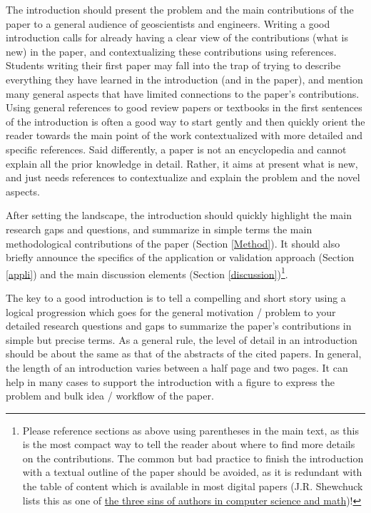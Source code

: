 \documentclass[preprint]{ring}
\begin{document}
The introduction should present the problem and the main contributions of the paper to a general audience of geoscientists and engineers. Writing a good introduction calls for already having a clear view of the contributions (what is new) in the paper, and contextualizing these contributions using references. Students writing their first paper may fall into the trap of trying to describe everything they have learned in the introduction (and in the paper), and mention many general aspects that have limited connections to the paper's contributions. Using general references to good review papers or textbooks in the first sentences of the introduction is often a good way to start gently and then quickly orient the reader towards the main point of the work contextualized with more detailed and specific references. Said differently, a paper is not an encyclopedia and cannot explain all the prior knowledge in detail. Rather, it aims at present what is new, and just needs references to contextualize and explain the problem and the novel aspects. 

After setting the landscape, the introduction should quickly highlight the main research gaps and questions, and summarize in simple terms the main methodological contributions of the paper (Section \ref{Method}). It should also briefly announce the specifics of the application or validation approach (Section \ref{appli}) and the main discussion elements (Section \ref{discussion})\footnote{Please reference sections as above using parentheses in the main text, as this is the most compact way to tell the reader about where to find more details on the contributions. The common but bad practice to finish the introduction with a textual outline of the paper should be avoided, as it is redundant with the table of content which is available in most digital papers (J.R. Shewchuck lists this as one of \href{https://www.cs.cmu.edu/~jrs/sins.html}{the three sins of authors in computer science and math})!}.

The key to a good introduction is to tell a compelling and short story using a logical progression which goes for the general motivation / problem to your detailed research questions and gaps to summarize the paper's contributions in simple but precise terms. As a general rule, the level of detail in an introduction should be about the same as that of the abstracts of the cited papers. In general, the length of an introduction varies between a half page and two pages. It can help in many cases to support the introduction with a figure to express the problem and bulk idea / workflow of the paper. 
\end{document}
